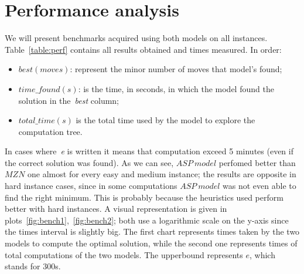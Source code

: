 \documentclass[headinclude, footinclude, abstract=on]{scrarticle}
\begin{document}
\section{Performance analysis}
We will present benchmarks acquired using both models on all instances. Table~\ref{table:perf} contains all results obtained and times measured. In order:
\begin{itemize}
    \item $best (moves)$: represent the minor number of moves that model's found;
    \item ${time\_found(s)}$: is the time, in seconds, in which the model found the solution in the~\textit{best} column;
    \item ${total\_time(s)}$ is the total time used by the model to explore the computation tree.
\end{itemize}
In cases where~\textit{e} is written it means that computation exceed 5 minutes (even if the correct solution was found). 
As we can see, $ASP\ model$ perfomed better than $MZN$ one almost for every easy and medium instance; the results are opposite in hard instance cases, since in some computations $ASP\ model$ was not even able to find the right minimum. This is probably because the heuristics used perform better with hard instances. A visual representation is given in plots~\ref{fig:bench1},~\ref{fig:bench2}; both use a logarithmic scale on the y-axis since the times interval is slightly big. The first chart represents times taken by the two models to compute the optimal solution, while the second one represents times of total computations of the two models. The upperbound represents $e$, which stands for 300s.
\end{document}
